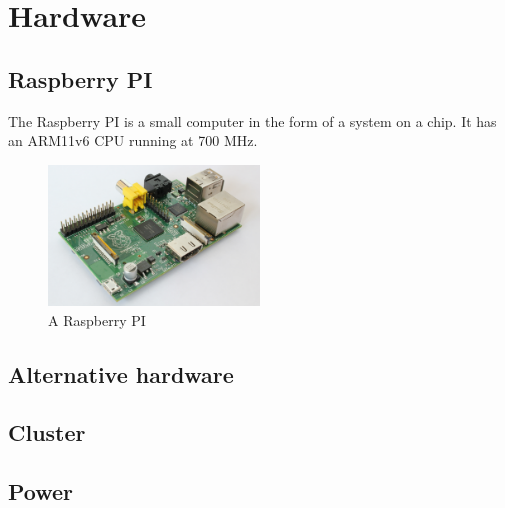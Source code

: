 \section{Hardware}
\subsection{Raspberry PI}
The Raspberry PI is a small computer in the form of a system on a chip. It has an ARM11v6 CPU running at 700 MHz.
\begin{figure}
    \centering
    \includegraphics[width=0.5\textwidth]{hardware/RaspberryPi}
    \caption{A Raspberry PI}
    \label{fig:raspberrypi_hw}
\end{figure}

\subsection{Alternative hardware}
\subsection{Cluster}
\subsection{Power}
